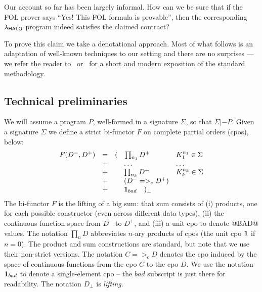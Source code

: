 Our account so far has been largely informal.  How can we be sure
that if the FOL prover says ``Yes!  This FOL formula is provable'', then
the corresponding $\lambda_{\sf HALO}$ program indeed satisfies the claimed contract?

To prove this claim we take a denotational approach.
Most of what follows is an adaptation of well-known techniques to
our setting and there are no surprises --- we refer the reader
to~\cite{winskel} or~\cite{benton+:coq-domains} for a short and modern
exposition of the standard methodology.

\subsection{Technical preliminaries}

We will assume a program $P$, well-formed in a signature $\Sigma$, so
that $\Sigma |- P$.
Given a signature $\Sigma$ we define a strict
bi-functor $F$ on complete partial orders (cpos), below:
\[\begin{array}{lclll}
  F(D^{-},D^{+}) & = & ( \quad{\prod_{n_1}{D^{+}}} & K_1^{n_1} \in \Sigma \\
               & + & \;\quad\ldots                    & \ldots \\
               & + & \;\quad{\prod_{n_k}{D^{+}}} & K_k^{n_k} \in \Sigma \\
               & + & \;\quad(D^{-} =>_c D^{+}) \\
               & + & \;\quad{\sf{\bf 1}}_{bad} \quad )_{\bot}
\end{array}\]
The bi-functor $F$ is the lifting of a big sum: that sum consists of
(i) products, one for each possible constructor (even across different data types), (ii) the continuous
function space from $D^{-}$ to $D^{+}$, and (iii) a unit cpo to denote @BAD@ values.
The notation $\prod_{n}{D}$ abbreviates $n$-ary products of cpos (the unit cpo ${\sf{\bf 1}}$ if $n = 0$).
The product and sum constructions are standard, but note that we use their non-strict versions.
The notation $C =>_c D$ denotes the cpo
induced by the space of continuous functions from the cpo $C$ to the cpo $D$. We use
the notation ${\sf{\bf 1}}_{bad}$ to
denote a single-element cpo -- the $bad$ subscript is just there for readability.
The notation $D_\bot$ is {\em lifting}.

